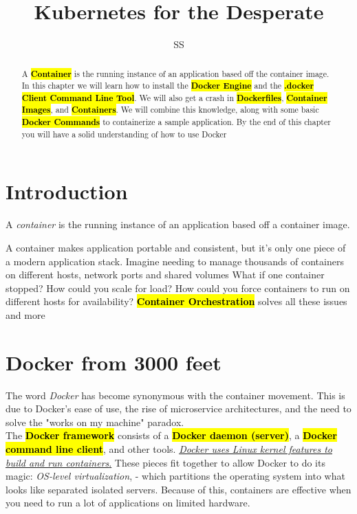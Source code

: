 \documentclass{article}
\title{Kubernetes for the Desperate}
\author{SS}
\begin{document}
\maketitle

\begin{abstract}
A \textbf{\textcolor{red}{\hl{Container}}} is the running instance of an application based off the container image. In this chapter we will learn how to install the \textbf{\textcolor{red}{\hl{Docker Engine}}} and the \textbf{\textcolor{red}{\hl{.docker Client Command Line Tool}}}. We will also get a crash in \textbf{\textcolor{red}{\hl{Dockerfiles}}}, \textbf{\textcolor{red}{\hl{Container Images}}}, and \textbf{\textcolor{red}{\hl{Containers}}}. We will combine this knowledge, along with some basic \textbf{\textcolor{red}{\hl{Docker Commands}}} to containerize a sample application. By the end of this chapter you will have a solid understanding of how to use Docker 
\end{abstract}

\section{Introduction}
\begin{tcolorbox}[colback=red!5!white, colframe=red!50!black,title=Container ] 
A \textit{container} is the running instance of an application based off a container image.
\end{tcolorbox}
A container makes application portable and consistent, but it's only one piece of a modern application stack. Imagine needing to manage thousands of containers on different hosts, network ports and shared volumes What if one container stopped? How could you scale for load? How could you force containers to run on different hosts for availability? \textbf{\textcolor{red}{\hl{Container Orchestration}}} solves all these issues and more  \\

\section{Docker from 3000 feet}
The word \textit{Docker} has become synonymous with the container movement. This is due to Docker's ease of use, the rise of microservice architectures, and the need to solve the "works on my machine" paradox. \\
The \textbf{\textcolor{red}{\hl{Docker framework}}} consists of a \textbf{\textcolor{red}{\hl{Docker daemon (server)}}}, a \textbf{\textcolor{red}{\hl{Docker command line client}}}, and other tools. \underline{ \textit{Docker uses Linux kernel features to build and run containers}.} These pieces fit together to allow Docker to do its magic: \textit{OS-level virtualization}, - which partitions the operating system into what looks like separated isolated servers. Because of this, containers are effective when you need to run a lot of applications on limited hardware. 
\\
\end{document}
